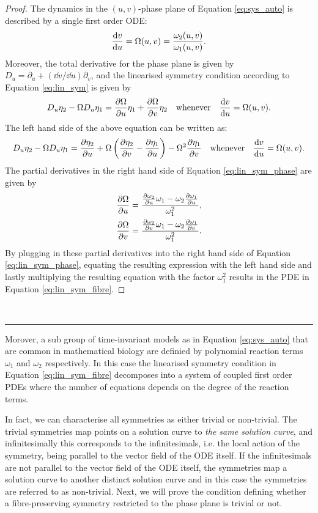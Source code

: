   \dotfill
\begin{proof}
  The dynamics in the $(u,v)$-phase plane of Equation \eqref{eq:sys_auto} is described by a single first order ODE:
\begin{equation}
\dv{v}{u}=\Omega(u,v)=\dfrac{\omega_2(u,v)}{\omega_1(u,v)}.
  \label{eq:sys_phase}
\end{equation}
Moreover, the total derivative for the phase plane is given by $D_u=\partial_u+(\dd v/\dd u)\partial_v$, and the linearised symmetry condition according to Equation \eqref{eq:lin_sym} is given by
\begin{equation}
  D_u\eta_2-\Omega D_u\eta_1=\pdv{\Omega}{u}\eta_1+\pdv{\Omega}{v}\eta_2\quad\textrm{whenever}\quad\dv{v}{u}=\Omega(u,v).
  \label{eq:lin_sym_phase}
  \end{equation}
The left hand side of the above equation can be written as:
\begin{equation*}
  D_u\eta_2-\Omega D_u\eta_1=\pdv{\eta_2}{u}+\Omega\left(\pdv{\eta_2}{v}-\pdv{\eta_1}{u}\right)-\Omega^2\pdv{\eta_1}{v}\quad\textrm{whenever}\quad\dv{v}{u}=\Omega(u,v).
\end{equation*}
The partial derivatives in the right hand side of Equation \eqref{eq:lin_sym_phase} are given by
\begin{align*}
  \pdv{\Omega}{u}&=\dfrac{\pdv{\omega_2}{u}\omega_1-\omega_2\pdv{\omega_1}{u}}{\omega_1^{2}},\\
  \pdv{\Omega}{v}&=\dfrac{\pdv{\omega_2}{v}\omega_1-\omega_2\pdv{\omega_1}{v}}{\omega_1^{2}}.
\end{align*}
By plugging in these partial derivatives into the right hand side of Equation \eqref{eq:lin_sym_phase}, equating the resulting expression with the left hand side and lastly multiplying the resulting equation with the factor $\omega_1^{2}$ results in the PDE in Equation \eqref{eq:lin_sym_fibre}. 
\end{proof}
\dotfill\\
\hrule
$\;$\\Morover, a sub group of time-invariant models as in Equation \eqref{eq:sys_auto} that are common in mathematical biology are definied by polynomial reaction terms $\omega_1$ and $\omega_2$ respectively. In this case the linearised symmetry condition in Equation \eqref{eq:lin_sym_fibre} decomposes into a system of coupled first order PDEs where the number of equations depends on the degree of the reaction terms.

In fact, we can characterise all symmetries as either trivial or non-trivial. The trivial symmetries map points on a solution curve to \textit{the same solution curve}, and infinitesimally this corresponds to the infinitesimals, i.e. the local action of the symmetry, being parallel to the vector field of the ODE itself. If the infinitesimals are not parallel to the vector field of the ODE itself, the symmetries map a solution curve to another distinct solution curve and in this case the symmetries are referred to as non-trivial. Next, we will prove the condition defining whether a fibre-preserving symmetry restricted to the phase plane is trivial or not. 

